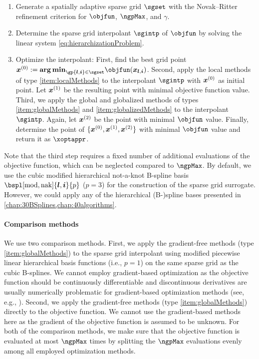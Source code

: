 \begin{enumerate}
  \item
  Generate a spatially adaptive sparse grid $\sgset$
  with the Novak--Ritter refinement criterion
  for $\objfun$, $\ngpMax$, and $\gamma$.
  
  \item
  Determine the sparse grid interpolant $\sgintp$ of $\objfun$
  by solving the linear system \eqref{eq:hierarchizationProblem}.
  
  \item
  Optimize the interpolant:
  First, find the best grid point
  $\*x^{(0)} := \*\argmin_{\gp{\*l,\*i} \in \sgset} \objfun(\*x_{\*l,\*i})$.
  Second, apply the local methods of type \ref{item:localMethods}
  to the interpolant $\sgintp$ with ${\boldsymbol{x}}^{(0)}$ as initial point.
  Let ${\boldsymbol{x}}^{(1)}$ be the resulting point with minimal objective function value.
  Third, we apply the global and globalized methods
  of types \ref{item:globalMethods} and \ref{item:globalizedMethods}
  to the interpolant $\sgintp$.
  Again, let ${\boldsymbol{x}}^{(2)}$ be the point with
  minimal $\objfun$ value.
  Finally, determine the point of $\{{\boldsymbol{x}}^{(0)}, {\boldsymbol{x}}^{(1)}, {\boldsymbol{x}}^{(2)}\}$
  with minimal $\objfun$ value and return it as $\xoptappr$.
\end{enumerate}

Note that the third step requires a fixed number of additional
evaluations of the objective function,
which can be neglected compared to $\ngpMax$.
By default, we use the cubic modified hierarchical not-a-knot B-spline basis
$\bspl[\modified,\nak]{\*l,\*i}{p}$ ($p = 3$)
for the construction of the sparse grid surrogate.
However, we could apply any of the hierarchical (B-)spline bases presented in
\cref{chap:30BSplines,chap:40algorithms}.

\paragraph{Comparison methods}

We use two comparison methods.
First, we apply the gradient-free methods
(type \ref{item:globalMethods}) to the sparse grid interpolant
using modified piecewise linear hierarchical basis functions
(i.e., $p = 1$) on the same sparse grid as the cubic B-splines.
We cannot employ gradient-based optimization as the objective function
should be continuously differentiable and
discontinuous derivatives are usually numerically problematic
for gradient-based optimization methods
(see, e.g., \cite{Huebner14Mehrdimensionale}).
Second, we apply the gradient-free methods
(type \ref{item:globalMethods}) directly to the objective function.
We cannot use the gradient-based methods here as the gradient of the
objective function is assumed to be unknown.
For both of the comparison methods,
we make sure that the objective function is evaluated at most $\ngpMax$ times
by splitting the $\ngpMax$ evaluations
evenly among all employed optimization methods.

